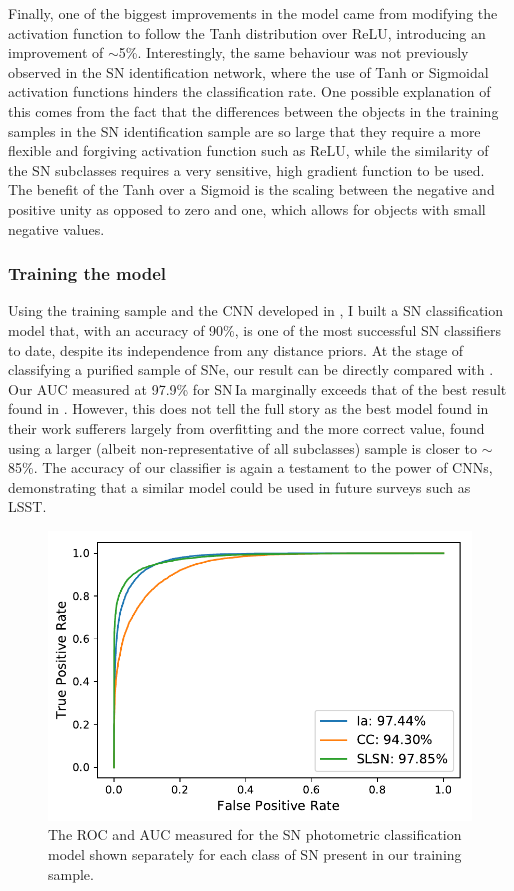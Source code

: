 Finally, one of the biggest improvements in the model came from modifying the activation function to follow the Tanh distribution over ReLU, introducing an improvement of $\sim$5\%. Interestingly, the same behaviour was not previously observed in the SN identification network, where the use of Tanh or Sigmoidal activation functions hinders the classification rate. One possible explanation of this comes from the fact that the differences between the objects in the training samples in the SN identification sample are so large that they require a more flexible and forgiving activation function such as ReLU, while the similarity of the SN subclasses requires a very sensitive, high gradient function to be used. The benefit of the Tanh over a Sigmoid is the scaling between the negative and positive unity as opposed to zero and one, which allows for objects with small negative values.

\subsubsection{Training the model} \label{sec:SNClassification}
Using the training sample and the CNN developed in , I built a SN classification model that, with an accuracy of 90\%, is one of the most successful SN classifiers to date, despite its independence from any distance priors. At the stage of classifying a purified sample of SNe, our result can be directly compared with \citet{Lochner2016}. Our AUC measured at 97.9\% for SN\,Ia marginally exceeds that of the best result found in \citet{Lochner2016}. However, this does not tell the full story as the best model found in their work sufferers largely from overfitting and the more correct value, found using a larger (albeit non-representative of all subclasses) sample is closer to $\sim$85\%. The accuracy of our classifier is again a testament to the power of CNNs, demonstrating that a similar model could be used in future surveys such as LSST.

\begin{figure}
  \includegraphics[width=\textwidth]{Figures/Chapter5/SNROC.pdf}
  \caption{The ROC and AUC measured for the SN photometric classification model shown separately for each class of SN present in our training sample.}
  \label{fig:SNClassificationROC}
\end{figure}


